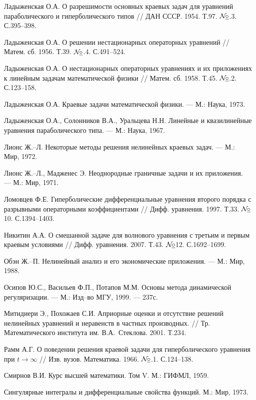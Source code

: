 \documentclass{report}
\newcommand{\No}{${\cal N}{\!}\underline{\circ}$}
\begin{document}
\begin{thebibliography}{99}
 Ладыженская О.А. О разрешимости основных краевых задач для уравнений параболического и гиперболического типов // ДАН СССР. 1954. Т.97. \No.3. С.395--398.

 Ладыженская О.А. О решении нестационарных операторных уравнений // Матем. сб. 1956. Т.39. \No.4. С.491--524.

 Ладыженская О.А. О нестационарных операторных уравнениях и их приложениях к линейным задачам математической физики // Матем. сб. 1958. Т.45. \No.2. С.123--158.

 Ладыженская О.А. Краевые задачи математической физики. --- М.: Наука, 1973.

  Ладыженская О.А., Солонников В.А., Уральцева Н.Н. Линейные и квазилинейные уравнения параболического типа. --- М.: Наука, 1967.

 Лионс Ж.--Л. Некоторые методы решения нелинейных краевых задач. --- М.: Мир, 1972.

 Лионс Ж.--Л., Мадженес Э. Неоднородные граничные задачи и их приложения. --- М.: Мир, 1971.

 Ломовцев Ф.Е. Гиперболические дифференциальные уравнения второго порядка с разрывными операторными коэффициентами // Дифф. уравнения. 1997. Т.33. \No10. С.1394--1403.

 Никитин А.А. О смешанной задаче для волнового уравнения с третьим и первым краевым условиями // Дифф. уравнения. 2007. Т.43. \No12. С.1692--1699.

 Обэн Ж.--П. Нелинейный анализ и его экономические приложения. --- М.: Мир, 1988.

 Осипов Ю.С., Васильев Ф.П., Потапов М.М. Основы метода динамической регуляризации. --- М.: Изд--во МГУ, 1999. --- 237с.

 Митидиери Э., Похожаев С.И. Априорные оценки и отсутствие решений нелинейных уравнений и неравенств в частных производных. // Тр. Математического института
им. В.А.~Стеклова. 2001. Т.234.

 Рамм А.Г. О поведении решения краевой задачи для гиперболического уравнения при $t\to\infty$ // Изв. вузов. Математика. 1966. \No.1. С.124--138.

 {Смирнов В.И.} Курс высшей математики. Том V. М.: ГИФМЛ, 1959.

 Сингулярные интегралы и дифференциальные свойства функций. М.: Мир, 1973.


\end{thebibliography}
\end{document}
